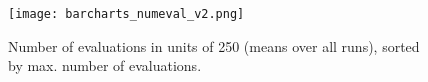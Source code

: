 \documentclass[10pt,journal,compsoc]{IEEEtran}
\begin{document}
\begin{figure}[!b]
\texttt{[image: barcharts\_numeval\_v2.png]}
\caption{Number of evaluations in units of 250 (means over all runs), sorted
by max. number of evaluations.}\label{fig:evals} 
\end{figure}
\end{document}
